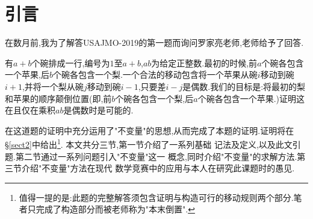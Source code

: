 \section{引言}
    在数月前,我为了解答USAJMO-2019的第一题而询问罗家亮老师,老师给予了回答.
    \begin{problema}
	有$a+b$个碗排成一行,编号为$1$至$a+b$,$a$$b$为给定正整数.最初的时候,前$a$个碗各包含一个苹果,后$b$个碗各包含一个梨.一个合法的移动包含将一个苹果从碗$i$移动到碗$i+1$,并将一个梨从碗$j$移动到碗$i-1$,只要差$i-j$是偶数.我们的目标是:将最初的梨和苹果的顺序颠倒位置(即,前$b$个碗各包含一个梨,后$a$个碗各包含一个苹果.)证明这在且仅在乘积$ab$是偶数时是可能的.
		\label{pbl:ini}
    \end{problema}
    在这道题的证明中充分运用了"不变量"的思想,从而完成了本题的证明.证明将在\S\ref{sect2}中给出\footnote{值得一提的是:此题的完整解答须包含证明与构造可行的移动规则两个部分.笔者只完成了构造部分而被老师称为"本末倒置".}.
    本文共分三节,第一节介绍了一系列基础
        记法及定义,以及此文引题.第二节通过一系列问题引入"不变量"这一
        概念,同时介绍"不变量"的求解方法.第三节介绍"不变量"方法在现代
        数学竞赛中的应用与本人在研究此课题时的愚见.
    